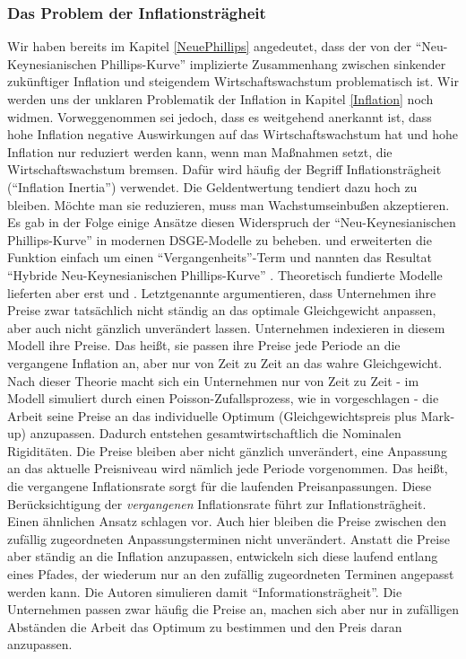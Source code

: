 \subsubsection{Das Problem der Inflationsträgheit}
Wir haben bereits im Kapitel \ref{NeuePhillips} angedeutet, dass der von der "`Neu-Keynesianischen Phillips-Kurve"' implizierte  Zusammenhang zwischen sinkender zukünftiger Inflation und steigendem Wirtschaftswachstum problematisch ist. Wir werden uns der unklaren Problematik der Inflation in Kapitel \ref{Inflation} noch widmen. Vorweggenommen sei jedoch, dass es weitgehend anerkannt ist, dass hohe Inflation negative Auswirkungen auf das Wirtschaftswachstum hat und hohe Inflation nur reduziert werden kann, wenn man Maßnahmen setzt, die Wirtschaftswachstum bremsen. Dafür wird häufig der Begriff Inflationsträgheit ("`Inflation Inertia"') verwendet. Die Geldentwertung tendiert dazu hoch zu bleiben. Möchte man sie reduzieren, muss man Wachstumseinbußen akzeptieren. Es gab in der Folge einige Ansätze diesen Widerspruch der "`Neu-Keynesianischen Phillips-Kurve"' in modernen DSGE-Modelle zu beheben. \textcite{Gali1999} und \textcite{Gali2005} erweiterten die Funktion einfach um einen "`Vergangenheits"'-Term und nannten das Resultat "`Hybride Neu-Keynesianischen Phillips-Kurve"' \parencite[S. 34]{Gali2007}. Theoretisch fundierte Modelle lieferten aber erst \textcite{Mankiw2002} und \textcite{Christiano2005}. 
Letztgenannte argumentieren, dass Unternehmen ihre Preise zwar tatsächlich nicht ständig an das optimale Gleichgewicht anpassen, aber auch nicht gänzlich unverändert lassen. Unternehmen indexieren in diesem Modell ihre Preise. Das heißt, sie passen ihre Preise jede Periode an die vergangene Inflation an, aber nur von Zeit zu Zeit an das wahre Gleichgewicht. Nach dieser Theorie macht sich ein Unternehmen nur von Zeit zu Zeit - im Modell simuliert durch einen Poisson-Zufallsprozess, wie in \textcite{Calvo1983} vorgeschlagen - die Arbeit seine Preise an das individuelle Optimum (Gleichgewichtspreis plus Mark-up) anzupassen. Dadurch entstehen gesamtwirtschaftlich die Nominalen Rigiditäten. Die Preise bleiben aber nicht gänzlich unverändert, eine Anpassung an das aktuelle Preisniveau wird nämlich jede Periode vorgenommen. Das heißt, die vergangene Inflationsrate sorgt für die laufenden Preisanpassungen. Diese Berücksichtigung der \textit{vergangenen} Inflationsrate führt zur Inflationsträgheit. Einen ähnlichen Ansatz schlagen \textcite{Mankiw2002} vor. Auch hier bleiben die Preise zwischen den zufällig zugeordneten Anpassungsterminen nicht unverändert. Anstatt die Preise aber ständig an die Inflation anzupassen, entwickeln sich diese laufend entlang eines Pfades, der wiederum nur an den zufällig zugeordneten Terminen angepasst werden kann. Die Autoren simulieren damit "`Informationsträgheit"'. Die Unternehmen passen zwar häufig die Preise an, machen sich aber nur in zufälligen Abständen die Arbeit das Optimum zu bestimmen und den Preis daran anzupassen.

